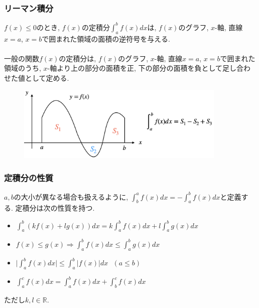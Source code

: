 \documentclass[dvipdfmx,cjk,10.2pt]{beamer}
\newcommand{\R}{\mathbb{R}}
\theoremstyle{definition}
\begin{document}


\begin{frame}
\frametitle{リーマン積分}


$f(x) \le 0$のとき, $f(x)$の定積分$\int_a^b f(x)dx$は, $f(x)$のグラフ, $x$-軸, 直線$x=a$, $x=b$で囲まれた領域の面積の逆符号を与える. \\
\ \\

一般の関数$f(x)$の定積分は, $f(x)$のグラフ, $x$-軸, 直線$x=a$, $x=b$で囲まれた領域のうち, 
$x$-軸より上の部分の面積を正, 下の部分の面積を負として足し合わせた値として定める. 

\vspace{-1mm}

\begin{figure}[htbp]
 \begin{center} 
  \includegraphics[width=100mm]{RiemannInt.png}
 \end{center}
\end{figure}

\vspace{-1mm}

\end{frame}




\begin{frame}
\frametitle{定積分の性質}

$a,b$の大小が異なる場合も扱えるように, $\int_b^a f(x)dx =- \int_a^b f(x)dx$と定義する. 
定積分は次の性質を持つ. 

\begin{itemize}
\item $\displaystyle \int_a^b (k f(x)+l g(x))dx =  k \int_a^b f(x)dx + l \int_a^b g(x)dx$
\item $\displaystyle f(x) \le g(x) \Longrightarrow  \int_a^b f(x)dx \le \int_a^b g(x)dx$
\item $\displaystyle \big| \int_a^b f(x)dx \big| \le \int_a^b |f(x)|dx \ \ \ (a \le b)$
\item $\displaystyle  \int_a^c f(x)dx = \int_a^b f(x)dx + \int_b^c f(x)dx$
\end{itemize}
ただし$k,l \in \R$. 

\end{frame}
\end{document}
